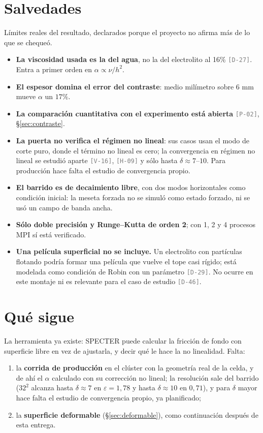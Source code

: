 \documentclass[11pt,a4paper]{article}
\newcommand{\etq}[1]{\textcolor{gray}{\texttt{[#1]}}}
\begin{document}
\section{Salvedades}

Límites reales del resultado, declarados porque el proyecto no afirma más de lo que se
chequeó.
\begin{itemize}
  \item \textbf{La viscosidad usada es la del agua}, no la del electrolito al 16\%
  \etq{D-27}. Entra a primer orden en $\alpha\propto\nu/h^2$.
  \item \textbf{El espesor domina el error del contraste}: medio milímetro sobre 6 mm
  mueve $\alpha$ un $17\%$.
  \item \textbf{La comparación cuantitativa con el experimento está abierta} \etq{P-02},
  §\ref{sec:contraste}.
  \item \textbf{La puerta no verifica el régimen no lineal}: sus casos usan el modo de
  corte puro, donde el término no lineal es cero; la convergencia en régimen no lineal se
  estudió aparte \etq{V-16}, \etq{H-09} y sólo hasta $\delta\approx7$--$10$. Para producción
  hace falta el estudio de convergencia propio.
  \item \textbf{El barrido es de decaimiento libre}, con dos modos horizontales como
  condición inicial: la meseta forzada no se simuló como estado forzado, ni se usó un
  campo de banda ancha.
  \item \textbf{Sólo doble precisión y Runge--Kutta de orden 2}; con 1, 2 y 4 procesos
  MPI sí está verificado.
  \item \textbf{Una película superficial no se incluye.} Un electrolito con partículas
  flotando podría formar una película que vuelve el tope casi rígido; está modelada como
  condición de Robin con un parámetro \etq{D-29}. No ocurre en este montaje ni es relevante
  para el caso de estudio \etq{D-46}.
\end{itemize}

\section{Qué sigue}

La herramienta ya existe: SPECTER puede calcular la fricción de fondo con superficie
libre en vez de ajustarla, y decir qué le hace la no linealidad. Falta:
\begin{enumerate}
  \item la \textbf{corrida de producción} en el clúster con la geometría real de la
  celda, y de ahí el $\alpha$ calculado con su corrección no lineal; la resolución sale
  del barrido ($32^2$ alcanza hasta $\delta\approx7$ en $\varepsilon=1{,}78$ y hasta
  $\delta\approx10$ en $0{,}71$), y para $\delta$ mayor hace falta el estudio de
  convergencia propio, ya planificado;
  \item la \textbf{superficie deformable} (§\ref{sec:deformable}), como continuación
  después de esta entrega.
\end{enumerate}
\end{document}
